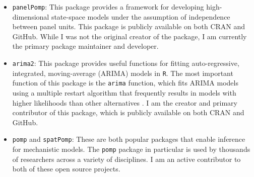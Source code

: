 \documentclass{article}
\begin{document}
\begin{itemize}
    \item \texttt{panelPomp}: This package provides a framework for developing high-dimensional state-space models under the assumption of independence between panel units.
    This package is publicly available on both CRAN and GitHub.
    While I was not the original creator of the package, I am currently the primary package maintainer and developer.

    \item \texttt{arima2}: This package provides useful functions for fitting auto-regressive, integrated, moving-average (ARIMA) models in \texttt{R}. The most important function of this package is the \texttt{arima} function, which fits ARIMA models using a multiple restart algorithm that frequently results in models with higher likelihoods than other alternatives \cite{wheelerARMA}.
    I am the creator and primary contributor of this package, which is publicly available on both CRAN and GitHub.

    \item \texttt{pomp} and \texttt{spatPomp}: These are both popular packages that enable inference for mechanistic models. The \texttt{pomp} package in particular is used by thousands of researchers across a variety of disciplines. I am an active contributor to both of these open source projects.


\end{itemize}



\end{document}
